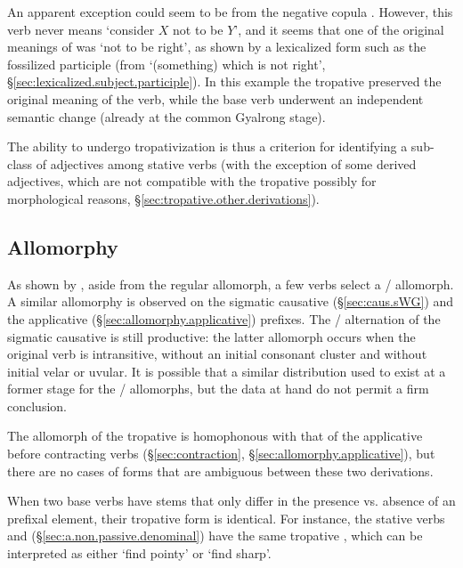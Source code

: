 An apparent exception could seem to be  from the negative copula . However, this verb never means `consider $X$ not to be $Y$', and it seems that one of the original meanings of   was `not to be right', as shown by a lexicalized form such as the fossilized participle  (from `(something) which is not right', §\ref{sec:lexicalized.subject.participle}). In this example the tropative preserved the original meaning of the verb, while the base verb underwent an independent semantic change (already at the common Gyalrong stage).

The ability to undergo tropativization is thus a criterion for identifying a sub-class of adjectives among stative verbs (with the exception of some derived adjectives, which are not compatible with the tropative possibly for morphological reasons, §\ref{sec:tropative.other.derivations}).

\subsection{Allomorphy} \label{sec:tropative.allomorphy}
    
As shown by , aside from the regular  allomorph, a few verbs select a  /  allomorph. A similar allomorphy is observed on the sigmatic causative (§\ref{sec:caus.sWG}) and the applicative (§\ref{sec:allomorphy.applicative}) prefixes. The  /  alternation of the sigmatic causative is still productive: the latter allomorph occurs when the original verb is intransitive, without an initial consonant cluster and without initial velar or uvular. It is possible that a similar distribution used to exist at a former stage for the  /  allomorphs, but the data at hand do not permit a firm conclusion.

The  allomorph of the tropative is homophonous with that of the applicative before  contracting verbs (§\ref{sec:contraction}, §\ref{sec:allomorphy.applicative}), but there are no cases of forms that are ambiguous between these two derivations.

When two base verbs have stems that only differ in the presence vs. absence of an  prefixal element, their tropative form is identical. For instance, the stative verbs  and  (§\ref{sec:a.non.passive.denominal}) have the same tropative , which can be interpreted as either `find pointy' or `find sharp'.

